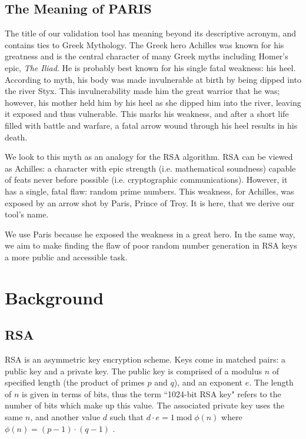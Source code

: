 \documentclass[smallextended]{svjour3}       %
\begin{document}
\subsection{The Meaning of PARIS}
\label{subsec:meaning}

The title of our validation tool has meaning beyond its descriptive acronym,
and contains ties to Greek Mythology. The Greek hero Achilles was known for
his greatness and is the central character of many Greek myths including
Homer's epic, \textit{The Iliad}\cite{homer2009iliad}. He is probably best
known for his single fatal weakness: his heel. According to myth, his body was
made invulnerable at birth by being dipped into the river Styx. This
invulnerability made him the great warrior that he was; however, his mother
held him by his heel as she dipped him into the river, leaving it exposed and
thus vulnerable. This marks his weakness, and after a short life filled with
battle and warfare, a fatal arrow wound through his heel results in his death.

We look to this myth as an analogy for the RSA algorithm. RSA can be viewed as
Achilles: a character with epic strength (i.e. mathematical soundness) capable
of feats never before possible (i.e. cryptographic communications).
However, it has a single, fatal flaw: random prime numbers. This weakness, for
Achilles, was exposed by an arrow shot by Paris, Prince of Troy. It is here,
that we derive our tool's name.

We use Paris because he exposed the weakness in a great hero. In the same way,
we aim to make finding the flaw of poor random number generation in RSA keys
a more public and accessible task. 


\section{Background}
\label{sec:background}

\subsection{RSA}
\label{subsec:rsa}
RSA is an asymmetric key encryption scheme. Keys come in matched pairs: a
public key and a private key. The public key is comprised of a modulus $n$ of
specified length (the product of primes $p$ and $q$), and an exponent $e$. The
length of $n$ is given in terms of bits, thus the term ``1024-bit RSA key"
refers to the number of bits which make up this value. The associated private
key uses the same $n$, and another value $d$ such that $d \cdot e = 1
\:\text{mod} \;\phi(n)$ where $\phi(n) = (p - 1) \cdot (q - 1)$
\citep{rivest1978method}.
\end{document}
